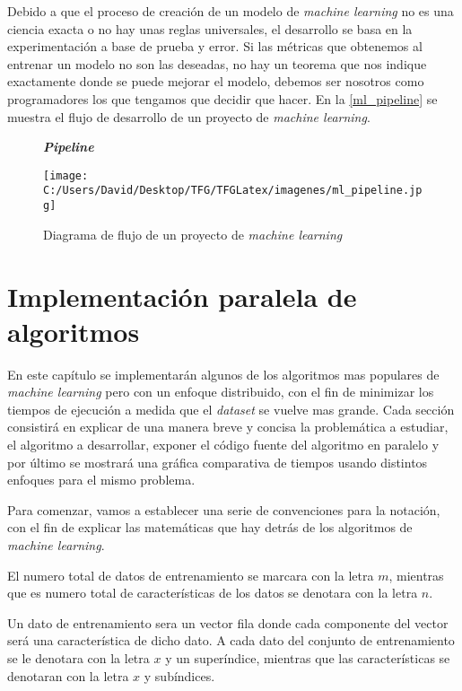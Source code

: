 Debido a que el proceso de creación de un modelo de \textit{machine learning} no es una ciencia exacta o no
hay unas reglas universales, el desarrollo se basa en la experimentación a base de prueba y error.
Si las métricas que obtenemos al entrenar un modelo no son las deseadas, no hay un teorema que nos indique
exactamente donde se puede mejorar el modelo, debemos ser nosotros como programadores los que tengamos que
decidir que hacer.\hfill \break
En la \autoref{ml_pipeline} se muestra el flujo de desarrollo de un proyecto de \textit{machine learning}.

\begin{figure}[h]
  \centering
  \textbf{\textbf{\textit{Pipeline}}}\par\medskip
  \texttt{[image: C:/Users/David/Desktop/TFG/TFGLatex/imagenes/ml\_pipeline.jpg]}
  \caption[\textit{Machine learning pipeline}]{Diagrama de flujo de un proyecto de \textit{machine learning}}
  \label{ml_pipeline}
\end{figure}

\clearpage


\chapter[Implementación paralela]{Implementación paralela de algoritmos}\label{chap:implementacion_paralela}
En este capítulo se implementarán algunos de los algoritmos mas populares de \textit{machine learning} 
pero con un enfoque distribuido, con el fin de minimizar los tiempos de ejecución a medida que
el \textit{dataset} se vuelve mas grande.
Cada sección consistirá en explicar de una manera breve y concisa la problemática a estudiar, 
el algoritmo a desarrollar, exponer el código fuente del algoritmo en paralelo y por último se mostrará
una gráfica comparativa de tiempos usando distintos enfoques para el mismo problema.
\newline

Para comenzar, vamos a establecer una serie de convenciones para la notación, con el fin de explicar
las matemáticas que hay detrás de los algoritmos de \textit{machine learning}.

El numero total de datos de entrenamiento se marcara con la letra $m$, mientras que es numero total
de características de los datos se denotara con la letra $n$.

Un dato de entrenamiento sera un vector fila donde cada componente del vector será una característica
de dicho dato. A cada dato del conjunto de entrenamiento se le denotara con la letra $x$ y un 
superíndice, mientras que las características se denotaran con la letra $x$ y subíndices. 

